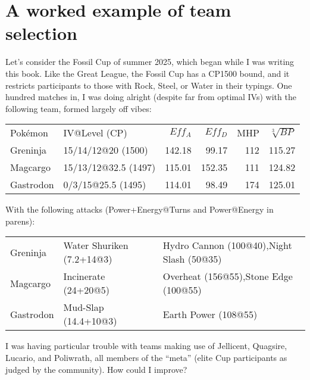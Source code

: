 \chapter{A worked example of team selection}
\label{chap:example}

Let's consider the Fossil Cup of summer 2025, which began while I was writing this book.
Like the Great League, the Fossil Cup has a CP1500 bound, and it
  restricts participants to those with Rock, Steel, or Water in their typings.
One hundred matches in, I was doing alright (despite far from optimal IVs)
  with the following team, formed largely off vibes:
\begin{center}
  \begin{tabular}{llrrrr}
    Pokémon & IV@Level (CP) & $Eff_A$ & $Eff_D$ & MHP & $\sqrt[3]{BP}$\\
    \Midrule
    Greninja & 15/14/12@20 (1500) & 142.18 & 99.17 & 112 & 115.27 \\
    Magcargo & 15/13/12@32.5 (1497) & 115.01 & 152.35 & 111 & 124.82 \\
    Gastrodon & 0/3/15@25.5 (1495) & 114.01 & 98.49 & 174 & 125.01 \\
  \end{tabular}
\end{center}
With the following attacks (Power+Energy@Turns and Power@Energy in parens):
\begin{center}
  \begin{tabular}{llp{}}
    Greninja & Water Shuriken (7.2+14@3) & Hydro Cannon (100@40),\newline Night Slash (50@35)\\
    Magcargo & Incinerate (24+20@5) & Overheat (156@55),\newline Stone Edge (100@55)\\
    Gastrodon & Mud-Slap (14.4+10@3) & Earth Power (108@55)\\
  \end{tabular}
\end{center}
I was having particular trouble with teams making use of Jellicent, Quagsire,
  Lucario, and Poliwrath, all members of the ``meta'' (elite Cup participants
  as judged by the community).
How could I improve?

